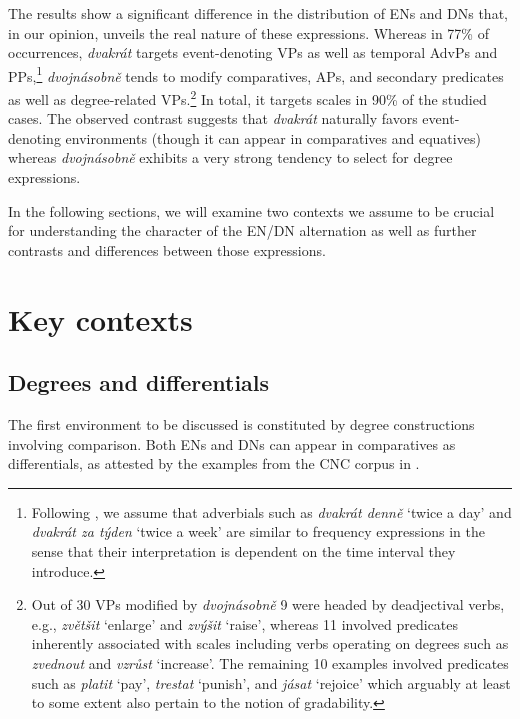 \documentclass[output=paper,modfonts,hidelinks,newtxmath
\ChapterDOI{10.5281/zenodo.2545513}
]{langscibook}
\begin{document}
\largerpage[2]
\noindent The results show a significant difference in the distribution of ENs and DNs that, in our opinion, unveils the real nature of these expressions. Whereas in 77\% of occurrences, \textit{dvakrát} targets event-denoting VPs as well as temporal AdvPs and PPs,\footnote{Following \cite{doetjes_adverbs_2007}, we assume that adverbials such as \textit{dvakrát denně} `twice a day' and \textit{dvakrát za týden} `twice a week' are similar to frequency expressions in the sense that their interpretation is dependent on the time interval they introduce.} \textit{dvojnásobně} tends to modify comparatives, APs, and secondary predicates as well as degree-related VPs.\footnote{Out of 30 VPs modified by \textit{dvojnásobně} 9 were headed by deadjectival verbs, e.g., \textit{zvětšit} `enlarge' and \textit{zvýšit} `raise', whereas 11 involved predicates inherently associated with scales including verbs operating on degrees such as \textit{zvednout} and \textit{vzrůst} `increase'. The remaining 10 examples involved predicates such as \textit{platit} `pay', \textit{trestat} `punish', and \textit{jásat} `rejoice' which arguably at least to some extent also pertain to the notion of gradability.} In total, it targets scales in 90\% of the studied cases. The observed contrast suggests that \textit{dvakrát} naturally favors event-denoting environments (though it can appear in comparatives and equatives) whereas \textit{dvoj\-násobně} exhibits a very strong tendency to select for degree expressions.

In the following sections, we will examine two contexts we assume to be crucial for understanding the character of the EN/DN alternation as well as further contrasts and differences between those expressions.

\section{Key contexts}\label{key-contexts}

\subsection{Degrees and differentials}\label{degrees-and-differentials}

The first environment to be discussed is constituted by degree constructions involving comparison. Both ENs and DNs can appear in comparatives as differentials, as attested by the examples from the CNC corpus in .
\end{document}
